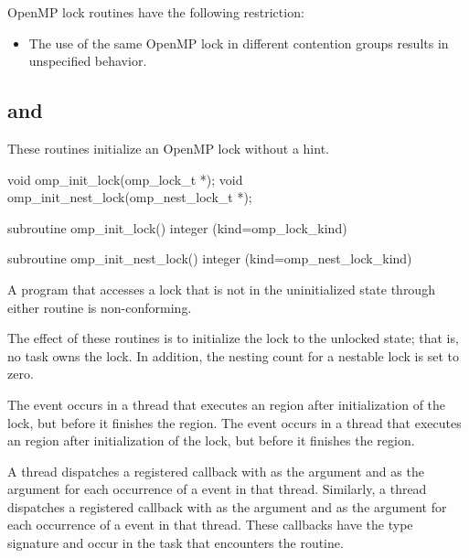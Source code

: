\restrictions
OpenMP lock routines have the following restriction:

\begin{itemize}
\item The use of the same OpenMP lock in different contention groups 
      results in unspecified behavior.
\end{itemize}



\subsection{ and }
\label{subsec:omp_init_lock and omp_init_nest_lock}
\summary
These routines initialize an OpenMP lock without a hint.

\format
\begin{ccppspecific}
\begin{ompcFunction}
void omp_init_lock(omp_lock_t *);
void omp_init_nest_lock(omp_nest_lock_t *);
\end{ompcFunction}
\end{ccppspecific}

\begin{fortranspecific}
\begin{ompfSubroutine}
subroutine omp_init_lock()
integer (kind=omp_lock_kind) 

subroutine omp_init_nest_lock()
integer (kind=omp_nest_lock_kind) 
\end{ompfSubroutine}
\end{fortranspecific}

\constraints
A program that accesses a lock that is not in the uninitialized state 
through either routine is non-conforming.

\effect
The effect of these routines is to initialize the lock to the unlocked 
state; that is, no task owns the lock. In addition, the nesting count 
for a nestable lock is set to zero.

\events
The  event occurs in a thread that executes an 
 region after initialization of the lock, but 
before it finishes the region. The  event occurs 
in a thread that executes an  region
after initialization of the lock, but before it finishes the region.

\tools
A thread dispatches a registered  
callback with  as the  argument 
and  as the  argument for each 
occurrence of a  event in that thread. Similarly, 
a thread dispatches a registered  
callback with  as the  argument 
and  as the  argument for each 
occurrence of a  event in that thread. These 
callbacks have the type signature 
and occur in the task that encounters the routine.

